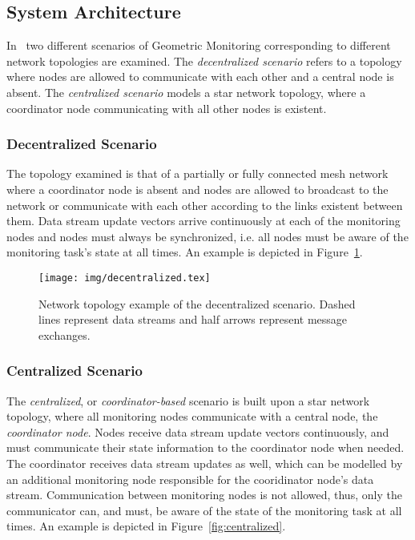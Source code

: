 \subsection{System Architecture} \label{subsec:theorBack-GM-sysArch}

In~\cite{Sharfman2006GM} two different scenarios of Geometric Monitoring corresponding to different network topologies are examined. The \emph{decentralized scenario} refers to a topology where nodes are allowed to communicate with each other and a central node is absent. The \emph{centralized scenario} models a star network topology, where a coordinator node communicating with all other nodes is existent.

\subsubsection{Decentralized Scenario} \label{subsubsec:theorBack-GM-decentralized}

The topology examined is that of a partially or fully connected mesh network where a coordinator node is absent and nodes are allowed to broadcast to the network or communicate with each other according to the links existent between them. Data stream update vectors arrive continuously at each of the monitoring nodes and nodes must always be synchronized, i.e. all nodes must be aware of the monitoring task's state at all times. An example is depicted in Figure~\ref{fig:decentralized}.

\begin{figure}[H]
\centering
\texttt{[image: img/decentralized.tex]}
\caption{Network topology example of the decentralized scenario. Dashed lines represent data streams and half arrows represent message exchanges.} 
\label{fig:decentralized}
\end{figure}

\subsubsection{Centralized Scenario}\label{subsubsec:theorBack-GM-centralized}

The \emph{centralized}, or \emph{coordinator-based} scenario is built upon a star network topology, where all monitoring nodes communicate with a central node, the \emph{coordinator node}. Nodes receive data stream update vectors continuously, and must communicate their state information to the coordinator node when needed. The coordinator receives data stream updates as well, which can be modelled by an additional monitoring node responsible for the cooridinator node's data stream. Communication between monitoring nodes is not allowed, thus, only the communicator can, and must, be aware of the state of the monitoring task at all times. An example is depicted in Figure~\ref{fig:centralized}.

